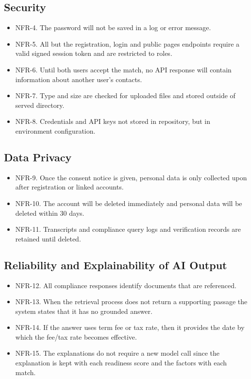 \documentclass{FastFyp}
\begin{document}
\subsection{Security}
\begin{itemize}
 \item NFR-4. The password will not be saved in a log or error message.
 \item NFR-5. All but the registration, login and public pages endpoints require a valid signed session token and are restricted to roles.
 \item NFR-6. Until both users accept the match, no API response will contain information about another user's contacts.
 \item NFR-7. Type and size are checked for uploaded files and stored outside of served directory.
 \item NFR-8. Credentials and API keys not stored in repository, but in environment configuration.
\end{itemize}

\subsection{Data Privacy}
\begin{itemize}
 \item NFR-9. Once the consent notice is given, personal data is only collected upon after registration or linked accounts.
 \item NFR-10. The account will be deleted immediately and personal data will be deleted within 30 days.
 \item NFR-11. Transcripts and compliance query logs and verification records are retained until deleted.
\end{itemize}

\subsection{Reliability and Explainability of AI Output}
\begin{itemize}
 \item NFR-12. All compliance responses identify documents that are referenced.
 \item NFR-13. When the retrieval process does not return a supporting passage the system states that it has no grounded answer.
 \item NFR-14. If the answer uses term fee or tax rate, then it provides the date by which the fee/tax rate becomes effective.
 \item NFR-15. The explanations do not require a new model call since the explanation is kept with each readiness score and the factors with each match.
\end{itemize}
\end{document}
